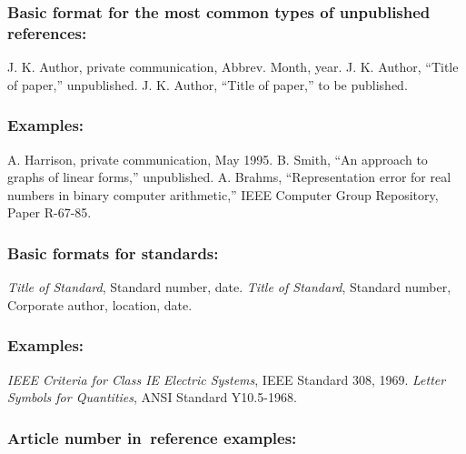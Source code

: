\documentclass{IEEEoj}
\begin{document}
\subsubsection*{Basic format for the most common types of unpublished references:}

\begin{thebibliography}{00}
 J. K. Author, private communication, Abbrev. Month, year.
 J. K. Author, ``Title of paper,'' unpublished.
 J. K. Author, ``Title of paper,'' to be published.
\end{thebibliography}

\subsubsection*{Examples:}

\begin{thebibliography}{00}
 A. Harrison, private communication, May 1995.
 B. Smith, ``An approach to graphs of linear forms,'' unpublished.
 A. Brahms, ``Representation error for real numbers in binary computer arithmetic,'' IEEE Computer Group Repository, Paper R-67-85.
\end{thebibliography}

\subsubsection*{Basic formats for standards:}

\begin{thebibliography}{00}
 \textit{Title of Standard}, Standard number, date.
 \textit{Title of Standard}, Standard number, Corporate author, location, date.
\end{thebibliography}

\subsubsection*{Examples:}

\begin{thebibliography}{00}
 \emph{IEEE Criteria for Class IE Electric Systems}, IEEE Standard 308, 1969.
 \emph{Letter Symbols for Quantities}, ANSI Standard Y10.5-1968.
\end{thebibliography}

\subsubsection*{Article number in~reference examples:}
\end{document}
